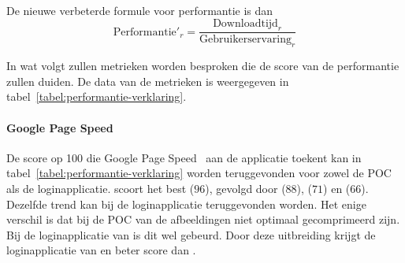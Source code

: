 De nieuwe verbeterde formule voor performantie is dan
\begin{equation}
  \text{Performantie}'_r = \frac{\text{Downloadtijd}_r}{\text{Gebruikerservaring}_r}
  \label{eq:performantie-enhanced}
\end{equation}



\begin{table}[H]
\centering
{}
\caption{Overzicht van performantie voor \st{}~(\sta), \kendo{}~(\kendoa), \jqm{}~(\jqma) en \lungo{}~(\lungoa). Minder is beter.}
\label{tabel:evaluatie-gebruik}
\end{table}


In wat volgt zullen metrieken worden besproken die de score van de performantie zullen duiden.
De data van de metrieken is weergegeven in tabel~\ref{tabel:performantie-verklaring}.

\paragraph{Google Page Speed}
De score op 100 die Google Page Speed~\cite{Morgan2011} aan de applicatie toekent kan in tabel~\ref{tabel:performantie-verklaring} worden teruggevonden voor zowel de POC als de loginapplicatie.
\st{} scoort het best ($96$),  gevolgd door \lungo{} ($88$),  \jqm{}($71$) en \kendo{}($66$).
Dezelfde trend kan bij de loginapplicatie teruggevonden worden.
Het enige verschil is dat bij de POC van \kendo{} de afbeeldingen niet optimaal gecomprimeerd zijn.
Bij de loginapplicatie van \kendo{} is dit wel gebeurd.
Door deze uitbreiding krijgt de loginapplicatie van \kendo{} en beter score dan \jqm{}.

